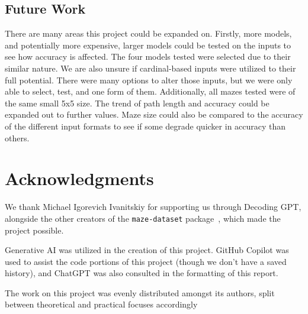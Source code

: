 \documentclass[conference]{IEEEtran}
\begin{document}
\subsection{Future Work}

There are many areas this project could be expanded on. Firstly, more models, and potentially more expensive, larger models could be tested on the inputs to see how accuracy is affected. The four models tested were selected due to their similar nature. We are also unsure if cardinal-based inputs were utilized to their full potential. There were many options to alter those inputs, but we were only able to select, test, and one form of them. Additionally, all mazes tested were of the same small 5x5 size. The trend of path length and accuracy could be expanded out to further values. Maze size could also be compared to the accuracy of the different input formats to see if some degrade quicker in accuracy than others.

\section{Acknowledgments}

We thank Michael Igorevich Ivanitskiy for supporting us through Decoding GPT, alongside the other creators of the \texttt{maze-dataset} package~\cite{ivanitskiy}, which made the project possible.

Generative AI was utilized in the creation of this project. GitHub Copilot was used to assist the code portions of this project (though we don't have a saved history), and ChatGPT was also consulted in the formatting of this report.

The work on this project was evenly distributed amongst its authors, split between theoretical and practical focuses accordingly
\end{document}
